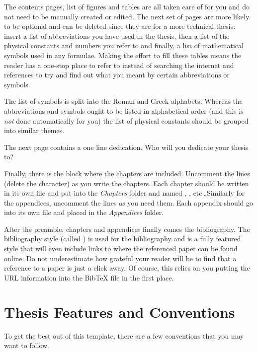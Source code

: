 The contents pages, list of figures and tables are all taken care of for you and do not need to be manually created or edited. The next set of pages are more likely to be optional and can be deleted since they are for a more technical thesis: insert a list of abbreviations you have used in the thesis, then a list of the physical constants and numbers you refer to and finally, a list of mathematical symbols used in any formulae. Making the effort to fill these tables means the reader has a one-stop place to refer to instead of searching the internet and references to try and find out what you meant by certain abbreviations or symbols.

The list of symbols is split into the Roman and Greek alphabets. Whereas the abbreviations and symbols ought to be listed in alphabetical order (and this is \emph{not} done automatically for you) the list of physical constants should be grouped into similar themes.

The next page contains a one line dedication. Who will you dedicate your thesis to?

Finally, there is the block where the chapters are included. Uncomment the lines (delete the \code{\%} character) as you write the chapters. Each chapter should be written in its own file and put into the \emph{Chapters} folder and named , , etc\ldots Similarly for the appendices, uncomment the lines as you need them. Each appendix should go into its own file and placed in the \emph{Appendices} folder.

After the preamble, chapters and appendices finally comes the bibliography. The bibliography style (called ) is used for the bibliography and is a fully featured style that will even include links to where the referenced paper can be found online. Do not underestimate how grateful your reader will be to find that a reference to a paper is just a click away. Of course, this relies on you putting the URL information into the BibTeX file in the first place.


\section{Thesis Features and Conventions}\label{ThesisConventions}

To get the best out of this template, there are a few conventions that you may want to follow.

